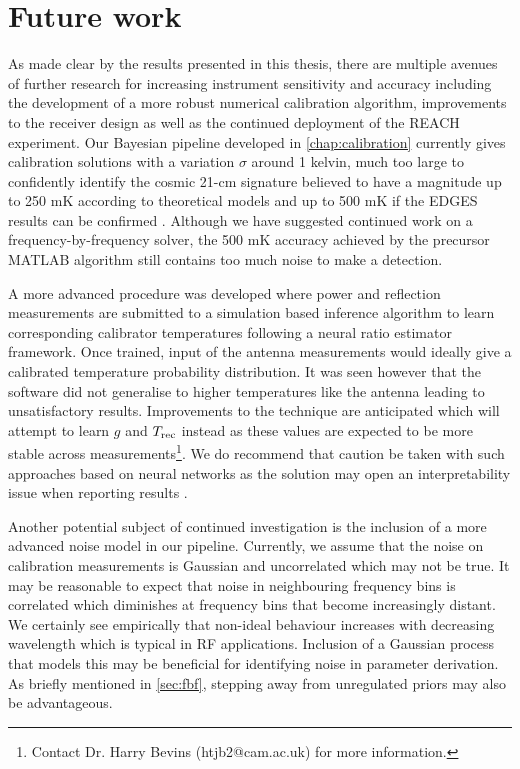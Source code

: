 \section{Future work}\label{sec:future}
As made clear by the results presented in this thesis, there are multiple avenues of further research for increasing instrument sensitivity and accuracy including the development of a more robust numerical calibration algorithm, improvements to the receiver design as well as the continued deployment of the REACH experiment. Our Bayesian pipeline developed in \cref{chap:calibration} currently gives calibration solutions with a variation $\sigma$ around 1 kelvin, much too large to confidently identify the cosmic 21-cm signature believed to have a magnitude up to 250 mK according to theoretical models and up to 500 mK if the EDGES results can be confirmed \citep{theory_models,edgesNature}. Although we have suggested continued work on a frequency-by-frequency solver, the 500 mK accuracy achieved by the precursor MATLAB algorithm still contains too much noise to make a detection.

A more advanced procedure was developed where power and reflection measurements are submitted to a simulation based inference algorithm to learn corresponding calibrator temperatures following a neural ratio estimator framework. Once trained, input of the antenna measurements would ideally give a calibrated temperature probability distribution. It was seen however that the software did not generalise to higher temperatures like the antenna leading to unsatisfactory results. Improvements to the technique are anticipated which will attempt to learn $g$ and $T_{\mathrm{rec}}$ instead as these values are expected to be more stable across measurements\footnote{Contact Dr. Harry Bevins (htjb2@cam.ac.uk) for more information.}. We do recommend that caution be taken with such approaches based on neural networks as the solution may open an interpretability issue when reporting results \citep{bb_interpret}.

Another potential subject of continued investigation is the inclusion of a more advanced noise model in our pipeline. Currently, we assume that the noise on calibration measurements is Gaussian and uncorrelated which may not be true. It may be reasonable to expect that noise in neighbouring frequency bins is correlated which diminishes at frequency bins that become increasingly distant. We certainly see empirically that non-ideal behaviour increases with decreasing wavelength which is typical in RF applications. Inclusion of a Gaussian process that models this may be beneficial for identifying noise in parameter derivation. As briefly mentioned in \cref{sec:fbf}, stepping away from unregulated priors may also be advantageous.

